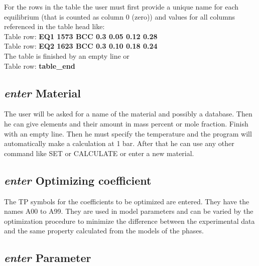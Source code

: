 \documentclass[12pt]{article}
\begin{document}
For the rows in the table the user must first provide a unique name
for each equilibrium (that is counted as column 0 (zero)) and values
for all columns referenced in the table head like:\\
Table row: {\bf EQ1 1573 BCC 0.3 0.05 0.12 0.28}\\
Table row: {\bf EQ2 1623 BCC 0.3 0.10 0.18 0.24}\\

The table is finished by an empty line or\\
Table row: {\bf table\_end}

\subsection{{\em enter} Material}

The user will be asked for a name of the material and possibly a
database.  Then he can give elements and their amount in mass percent
or mole fraction.  Finish with an empty line.  Then he must specify
the temperature and the program will automatically make a calculation
at 1 bar.  After that he can use any other command like SET or
CALCULATE or enter a new material.

\subsection{{\em enter} Optimizing coefficient}

The TP symbols for the coefficients to be optimized are entered.  They
have the names A00 to A99.  They are used in model parameters and can
be varied by the optimization procedure to minimize the difference
between the experimental data and the same property calculated from
the models of the phases.

\subsection{{\em enter} Parameter}
\end{document}
